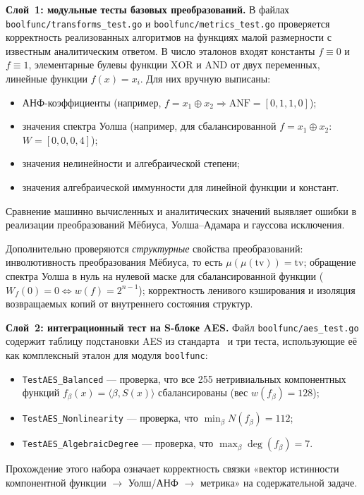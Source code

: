 \textbf{Слой~1: модульные тесты базовых преобразований.}
В файлах \texttt{boolfunc/transforms\_test.go} и
\texttt{boolfunc/metrics\_test.go} проверяется корректность
реализованных алгоритмов на функциях малой размерности с известным
аналитическим ответом. В число эталонов входят константы $f \equiv 0$
и $f \equiv 1$, элементарные булевы функции $\mathrm{XOR}$ и
$\mathrm{AND}$ от двух переменных, линейные функции $f(x) = x_i$.
Для них вручную выписаны:
\begin{itemize}
    \item АНФ-коэффициенты (например, $f = x_1 \oplus x_2 \Rightarrow
        \mathrm{ANF} = [0, 1, 1, 0]$);
    \item значения спектра Уолша (например, для сбалансированной
        $f = x_1 \oplus x_2$: $W = [0, 0, 0, 4]$);
    \item значения нелинейности и алгебраической степени;
    \item значения алгебраической иммунности для линейной функции
        и констант.
\end{itemize}
Сравнение машинно вычисленных и аналитических значений выявляет
ошибки в реализации преобразований Мёбиуса, Уолша–Адамара и
гауссова исключения.

Дополнительно проверяются \emph{структурные} свойства преобразований:
инволютивность преобразования Мёбиуса, то есть $\mu(\mu(\mathrm{tv})) = \mathrm{tv}$;
обращение спектра Уолша в нуль на нулевой маске для сбалансированной
функции ($W_f(0) = 0 \Leftrightarrow w(f) = 2^{n-1}$); корректность
ленивого кэширования и изоляция возвращаемых копий от внутреннего
состояния структур.

\textbf{Слой~2: интеграционный тест на S-блоке AES.} Файл
\texttt{boolfunc/aes\_test.go} содержит таблицу подстановки AES
из стандарта~\cite{fips197} и три теста, использующие её как
комплексный эталон для модуля \texttt{boolfunc}:
\begin{itemize}
    \item \texttt{TestAES\_Balanced} — проверка, что все 255
        нетривиальных компонентных функций $f_\beta(x) = \langle\beta, S(x)\rangle$
        сбалансированы (вес $w(f_\beta) = 128$);
    \item \texttt{TestAES\_Nonlinearity} — проверка, что
        $\min_\beta N(f_\beta) = 112$;
    \item \texttt{TestAES\_AlgebraicDegree} — проверка, что
        $\max_\beta \deg(f_\beta) = 7$.
\end{itemize}
Прохождение этого набора означает корректность связки «вектор
истинности компонентной функции $\to$ Уолш/АНФ $\to$ метрика»
на содержательной задаче.

